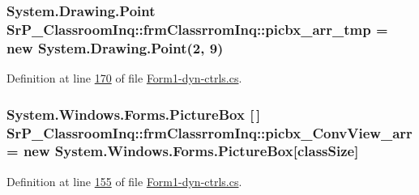\hypertarget{class_sr_p___classroom_inq_1_1frm_classrrom_inq_a019be294be5d02bea4369298d2a135db}{
\subsubsection[{picbx\-\_\-arr\-\_\-tmp}]{\setlength{\rightskip}{0pt plus 5cm}\-System.\-Drawing.\-Point {\bf \-Sr\-P\-\_\-\-Classroom\-Inq\-::frm\-Classrrom\-Inq\-::picbx\-\_\-arr\-\_\-tmp} = new \-System.\-Drawing.\-Point(2, 9)}}
\label{class_sr_p___classroom_inq_1_1frm_classrrom_inq_a019be294be5d02bea4369298d2a135db}


\-Definition at line \hyperlink{_form1-dyn-ctrls_8cs_source_l00170}{170} of file \hyperlink{_form1-dyn-ctrls_8cs_source}{\-Form1-\/dyn-\/ctrls.\-cs}.

\hypertarget{class_sr_p___classroom_inq_1_1frm_classrrom_inq_a4d179283a68569b1220534d91ddcf6d1}{
\subsubsection[{picbx\-\_\-\-Conv\-View\-\_\-arr}]{\setlength{\rightskip}{0pt plus 5cm}\-System.\-Windows.\-Forms.\-Picture\-Box \mbox{[}$\,$\mbox{]} {\bf \-Sr\-P\-\_\-\-Classroom\-Inq\-::frm\-Classrrom\-Inq\-::picbx\-\_\-\-Conv\-View\-\_\-arr} = new \-System.\-Windows.\-Forms.\-Picture\-Box\mbox{[}{\bf class\-Size}\mbox{]}}}
\label{class_sr_p___classroom_inq_1_1frm_classrrom_inq_a4d179283a68569b1220534d91ddcf6d1}


\-Definition at line \hyperlink{_form1-dyn-ctrls_8cs_source_l00155}{155} of file \hyperlink{_form1-dyn-ctrls_8cs_source}{\-Form1-\/dyn-\/ctrls.\-cs}.

